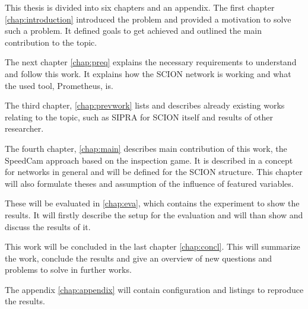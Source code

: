 \documentclass[thesis.tex]{subfiles}
\begin{document}
This thesis is divided into six chapters and an appendix. The first chapter \autoref{chap:introduction} introduced the problem and provided a motivation to solve such a problem. It defined goals to get achieved and outlined the main contribution to the topic.

The next chapter \autoref{chap:preq} explains the necessary requirements to understand and follow this work. It explains how the SCION network is working and what the used tool, Prometheus, is.

The third chapter, \autoref{chap:prevwork} lists and describes already existing works relating to the topic, such as SIPRA for SCION itself and results of other researcher. 

The fourth chapter, \autoref{chap:main} describes main contribution of this work, the SpeedCam approach based on the inspection game. It is described in a concept for networks in general and will be defined for the SCION structure. This chapter will also formulate theses and assumption of the influence of featured variables.

These will be evaluated in \autoref{chap:eva}, which contains the experiment to show the results. It will firstly describe the setup for the evaluation and will than show and discuss the results of it.

This work will be concluded in the last chapter \autoref{chap:concl}. This will summarize the work, conclude the results and give an overview of new questions and problems to solve in further works.

The appendix \autoref{chap:appendix} will contain configuration and listings to reproduce the results.

\subfilebib %
\end{document}

